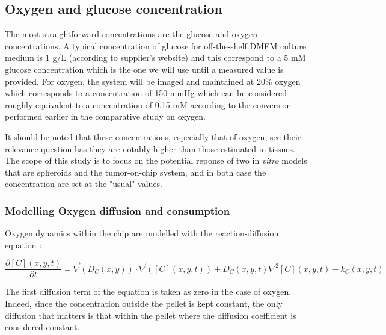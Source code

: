 \documentclass[11pt,a4paper]{article}
\begin{document}
\subsection{Oxygen and glucose concentration}
The most straightforward concentrations are the glucose and oxygen concentrations. A typical concentration of glucose for off-the-shelf DMEM culture medium is 1 g/L (according to supplier's website) and this correspond to a 5 mM glucose concentration which is the one we will use until a measured value is provided. For oxygen, the system will be imaged and maintained at 20\% oxygen which corresponds to a concentration of 150 mmHg which can be considered roughly equivalent to a concentration of 0.15 mM according to the conversion performed earlier in the comparative study on oxygen. 

It should be noted that these concentrations, especially that of oxygen, see their relevance question has they are notably higher than those estimated in tissues.\cite{McKeown2014} The scope of this study is to focus on the potential reponse of two in \textit{vitro} models that are spheroids and the tumor-on-chip system, and in both case the concentration are set at the "usual" values.

\subsubsection{Modelling Oxygen diffusion and consumption}
Oxygen dynamics within the chip are modelled with the reaction-diffusion equation :

\[ \frac{\partial [C](x,y,t)}{\partial t} = \overrightarrow{\nabla}(D_C(x,y)) \cdot \overrightarrow{\nabla}( [C](x,y,t)) + D_C(x,y,t) \nabla^2 [C](x,y,t) -k_C(x,y,t) \] 

The first diffusion term of the equation is taken as zero in the case of oxygen. Indeed, since the concentration outside the pellet is kept constant, the only diffusion that matters is that within the pellet where the diffusion coefficient is considered constant. 
\end{document}
